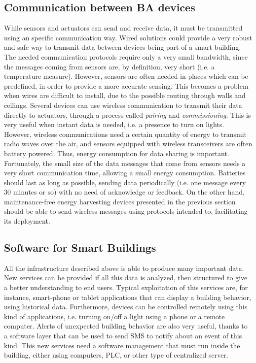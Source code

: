 \subsection{Communication between BA devices}
While sensors and actuators can send and receive data, it must be transmitted using an specific communication way.
Wired solutions could provide a very robust and safe way to transmit data between devices being part of a smart building.
The needed communication protocols require only a very small bandwidth, since the messages coming from sensors are, by definition, very short (i.e. a temperature measure).
However, sensors are often needed in places which can be predefined, in order to provide a more accurate sensing.
This becomes a problem when wires are difficult to install, due to the possible routing through walls and ceilings.
Several devices can use wireless communication to transmit their data directly to actuators, through a process called \textit{pairing} and \textit{commissioning}.
This is very useful when instant data is needed, i.e. a presence to turn on lights.
However, wireless communications need a certain quantity of energy to transmit radio waves over the air, and sensors equipped with wireless transceivers are often battery powered.
Thus, energy consumption for data sharing is important.
Fortunately, the small size of the data messages that come from sensors needs a very short communication time, allowing a small energy consumption.
Batteries should last as long as possible, sending data periodically (i.e. one message every 30 minutes or so) with no need of acknowledge or feedback.
On the other hand, maintenance-free energy harvesting devices presented in the previous section should be able to send wireless messages using protocols intended to, facilitating its deployment.

\subsection{Software for Smart Buildings}
All the infrastructure described above is able to produce many important data.
New services can be provided if all this data is analyzed, then structured to give a better understanding to end users.
Typical exploitation of this services are, for instance, smart-phone or tablet applications that can display a building behavior, using historical data.
Furthermore, devices can be controlled remotely using this kind of applications, i.e. turning on/off a light using a phone or a remote computer.
Alerts of unexpected building behavior are also very useful, thanks to a software layer that can be used to send SMS to notify about an event of this kind.
This new services need a software management that must run inside the building, either using computers, PLC, or other type of centralized server.


